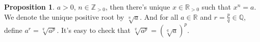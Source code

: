 \documentclass[12pt,a4paper]{book}
\newenvironment{prooff}{{\noindent\it\textcolor{cyan!40!black}{Proof}:}\,}{\par}
\newcommand{\bb}[1]{\mathbb{#1}}
\theoremstyle{definition}
\newtheorem{prop}[defn]{Proposition}
\begin{document}
\begin{prop}
    $a>0$, $n\in \bb{Z}_{>0}$, then there's unique $x\in \bb{R}_{>0}$ such that $x^n=a$. We denote the unique positive root by $\sqrt[n]{a}$. And for all $a\in \bb{R}$ and $r=\frac{p}{q}\in \bb{Q}$, define $a^{r}=\sqrt[q]{a^p}$. It's easy to check that $\sqrt[q]{a^p}=(\sqrt[q]{a})^p$.
\end{prop}

\end{document}
